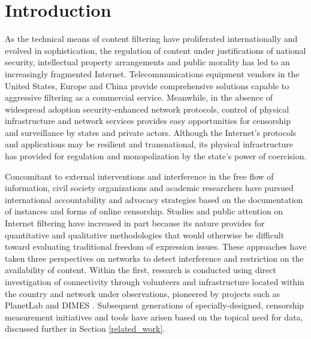 \section{Introduction}

As the technical means of content filtering have proliferated internationally and evolved in sophistication, the regulation of content under justifications of national security, intellectual property arrangements and public morality has led to an increasingly fragmented Internet. Telecommunications equipment vendors in the United States, Europe and China provide comprehensive solutions capable to aggressive filtering as a commercial service. Meanwhile, in the absence of widespread adoption security-enhanced network protocols, control of physical infrastructure and network services provides easy opportunities for censorship and surveillance by states and private actors. Although the Internet's protocols and applications may be resilient and transnational, its physical infrastructure has provided for regulation and monopolization by the state's power of coercision.

Concomitant to external interventions and interference in the free flow of information, civil society organizations and academic researchers have pursued international accountability and advocacy strategies based on the documentation of instances and forms of online censorship. Studies and public attention on Internet filtering have increased in part because its nature provides for quantitative and qualitative methodologies that would otherwise be difficult toward evaluating traditional freedom of expression issues. These approaches have taken three perspectives on networks to detect interference and restriction on the availability of content. Within the first, research is conducted using direct investigation of connectivity through volunteers and infrastructure located within the country and network under observations, pioneered by projects such as PlanetLab and DIMES \cite{chun2003planetlab, shavitt2005dimes}. Subsequent generations of specially-designed, censorship measurement initiatives and tools have arisen based on the topical need for data, discussed further in Section \ref{related_work}. 

